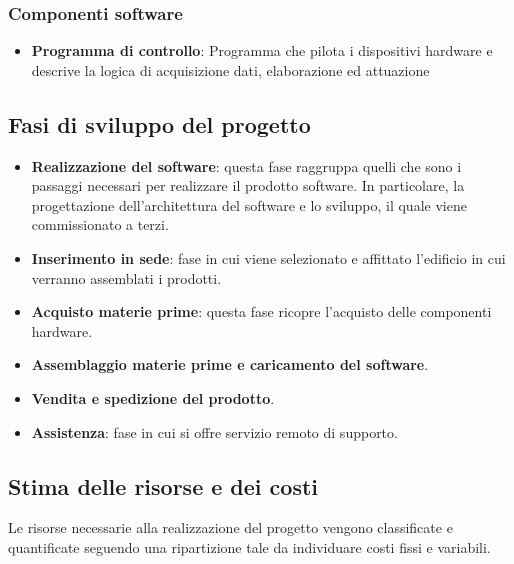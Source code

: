 \subsubsection{Componenti software}
\begin{itemize}
\item \textbf{Programma di controllo}: Programma che pilota i dispositivi
hardware e descrive la logica di acquisizione dati, elaborazione ed attuazione
\end{itemize}
\subsection{Fasi di sviluppo del progetto}
\begin{itemize}
\item \textbf{Realizzazione del software}: questa fase raggruppa quelli che sono
i passaggi necessari per realizzare il prodotto software. In particolare, la
progettazione dell'architettura del software e lo sviluppo, il quale viene
commissionato a terzi.
\item \textbf{Inserimento in sede}: fase in cui viene selezionato e affittato
l'edificio in cui verranno assemblati i prodotti.
\item \textbf{Acquisto materie prime}: questa fase ricopre l'acquisto delle
componenti hardware.
\item \textbf{Assemblaggio materie prime e caricamento del software}.
\item \textbf{Vendita e spedizione del prodotto}.
\item \textbf{Assistenza}: fase in cui si offre servizio remoto di supporto.
\end{itemize}
\subsection{Stima delle risorse e dei costi}
Le risorse necessarie alla realizzazione del progetto vengono classificate e
quantificate seguendo una ripartizione tale da individuare costi fissi e
variabili.  
%
